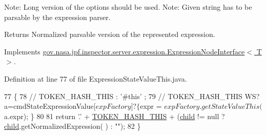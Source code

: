 Note\+: Long version of the options should be used. Note\+: Given string has to be parsable by the expression parser.

\begin{DoxyReturn}{Returns}
Normalized parsable version of the represented expression. 
\end{DoxyReturn}


Implements \hyperlink{interfacegov_1_1nasa_1_1jpf_1_1inspector_1_1server_1_1expression_1_1_expression_node_interface_ae5387d8da0126c1256a786d54b9bd7ce}{gov.\+nasa.\+jpf.\+inspector.\+server.\+expression.\+Expression\+Node\+Interface$<$ T $>$}.



Definition at line 77 of file Expression\+State\+Value\+This.\+java.


\begin{DoxyCode}
77                                            \{
78     \textcolor{comment}{// TOKEN\_HASH\_THIS : '#this' ;}
79     \textcolor{comment}{// TOKEN\_HASH\_THIS WS? a=cmdStateExpressionValue[$expFactory]? \{ $expr =
       $expFactory.getStateValueThis($a.expr); \}}
80 
81     \textcolor{keywordflow}{return} \textcolor{charliteral}{'.'} + \hyperlink{classgov_1_1nasa_1_1jpf_1_1inspector_1_1server_1_1expression_1_1expressions_1_1_expression_state_value_this_a8b028a2a41eeb9c7f8a338a231a45f6e}{TOKEN\_HASH\_THIS} + (\hyperlink{classgov_1_1nasa_1_1jpf_1_1inspector_1_1server_1_1expression_1_1_expression_state_unary_operator_a66041b1f569a361549e28a00f7ca5f2f}{child} != null ? \hyperlink{classgov_1_1nasa_1_1jpf_1_1inspector_1_1server_1_1expression_1_1_expression_state_unary_operator_a66041b1f569a361549e28a00f7ca5f2f}{child}.getNormalizedExpression(
      ) : \textcolor{stringliteral}{""});
82   \}
\end{DoxyCode}
